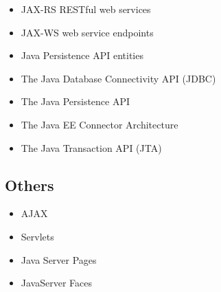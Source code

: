 \begin{itemize}
	\item JAX-RS RESTful web services
\end{itemize}

\begin{itemize}
	\item JAX-WS web service endpoints
\end{itemize}

\begin{itemize}
	\item Java Persistence API entities
\end{itemize}

\begin{itemize}
	\item The Java Database Connectivity API (JDBC)
\end{itemize}

\begin{itemize}
	\item The Java Persistence API
\end{itemize}

\begin{itemize}
	\item The Java EE Connector Architecture
\end{itemize}

\begin{itemize}
	\item The Java Transaction API (JTA)
\end{itemize}


\subsection{Others}
\begin{itemize}
	\item AJAX
\end{itemize}

\begin{itemize}
	\item Servlets
\end{itemize}

\begin{itemize}
	\item Java Server Pages
\end{itemize}


\begin{itemize}
	\item JavaServer Faces
\end{itemize}

